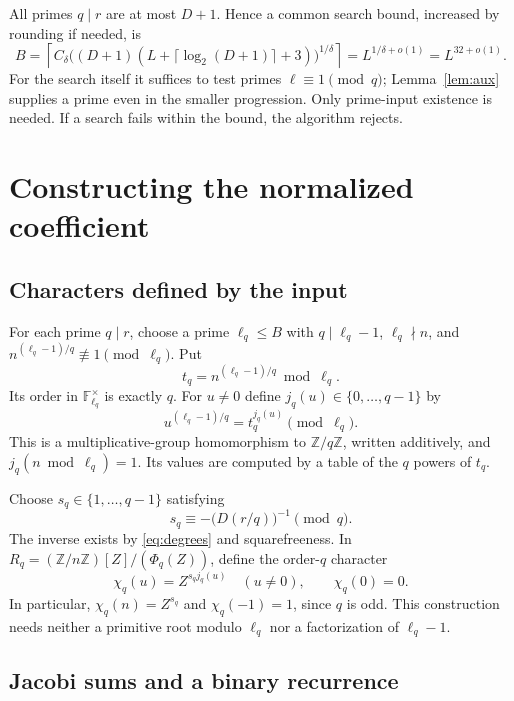 \documentclass[11pt]{article}
\theoremstyle{definition}
\theoremstyle{remark}
\newcommand{\Z}{\mathbb Z}
\newcommand{\F}{\mathbb F}
\begin{document}
All primes $q\mid r$ are at most $D+1$. Hence a common search
bound, increased by rounding if needed, is
\begin{equation}\label{eq:search-bound}
 B=\left\lceil C_\delta
 \bigl((D+1)(L+\lceil\log_2(D+1)\rceil+3)\bigr)^{1/\delta}
 \right\rceil=L^{1/\delta+o(1)}=L^{32+o(1)}.
\end{equation}
For the search itself it suffices to test primes
$\ell\equiv1\pmod q$; Lemma~\ref{lem:aux} supplies a prime
even in the smaller progression. Only prime-input existence is
needed. If a search fails within the bound, the algorithm rejects.

\section{Constructing the normalized coefficient}\label{sec:coefficient}

\subsection{Characters defined by the input}

For each prime $q\mid r$, choose a prime $\ell_q\le B$ with
$q\mid\ell_q-1$, $\ell_q\nmid n$, and
$n^{(\ell_q-1)/q}\not\equiv1\pmod{\ell_q}$.
Put
\[
 t_q=n^{(\ell_q-1)/q}\bmod\ell_q.
\]
Its order in $\F_{\ell_q}^\times$ is exactly $q$. For $u\ne0$
define $j_q(u)\in\{0,\ldots,q-1\}$ by
\[
 u^{(\ell_q-1)/q}=t_q^{j_q(u)}\pmod{\ell_q}.
\]
This is a multiplicative-group homomorphism to $\Z/q\Z$, written
additively, and $j_q(n\bmod\ell_q)=1$. Its values are computed
by a table of the $q$ powers of $t_q$.

Choose $s_q\in\{1,\ldots,q-1\}$ satisfying
\begin{equation}\label{eq:sq}
 s_q\equiv-\bigl(D(r/q)\bigr)^{-1}\pmod q.
\end{equation}
The inverse exists by \eqref{eq:degrees} and squarefreeness. In
$R_q=(\Z/n\Z)[Z]/(\Phi_q(Z))$, define the order-$q$ character
\begin{equation}\label{eq:chi}
 \chi_q(u)=Z^{s_qj_q(u)}\quad(u\ne0),\qquad \chi_q(0)=0.
\end{equation}
In particular, $\chi_q(n)=Z^{s_q}$ and $\chi_q(-1)=1$, since
$q$ is odd. This construction needs neither a primitive root
modulo $\ell_q$ nor a factorization of $\ell_q-1$.

\subsection{Jacobi sums and a binary recurrence}
\end{document}
